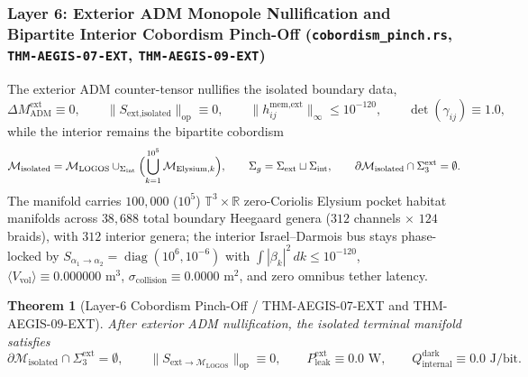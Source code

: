 \documentclass[11pt,onecolumn]{article}
\newtheorem{theorem}{Theorem}
\begin{document}
\subsubsection{Layer 6: Exterior ADM Monopole Nullification and Bipartite Interior Cobordism Pinch-Off (\texttt{cobordism\_pinch.rs}, \texttt{THM-AEGIS-07-EXT}, \texttt{THM-AEGIS-09-EXT})}
\label{subsec:aegis_layer6_cobordism}
The exterior ADM counter-tensor nullifies the isolated boundary data,
\begin{equation}
\Delta M_{\text{ADM}}^{\text{ext}}\equiv0,\qquad
\lVert S_{\text{ext},\text{isolated}}\rVert_{\text{op}}\equiv0,\qquad
\lVert h_{ij}^{\text{mem,ext}}\rVert_{\infty}\le10^{-120},\qquad
\det(\gamma_{ij})\equiv1.0,
\label{eq:aegis_adm_nullification}
\end{equation}
while the interior remains the bipartite cobordism
\begin{equation}
\mathcal{M}_{\text{isolated}}=\mathcal{M}_{\text{LOGOS}}\cup_{\Sigma_{\text{int}}}\Bigl(\bigcup_{k=1}^{10^5}\mathcal{M}_{\text{Elysium},k}\Bigr),
\qquad
\Sigma_g=\Sigma_{\text{ext}}\sqcup\Sigma_{\text{int}},
\qquad
\partial\mathcal{M}_{\text{isolated}}\cap\Sigma_3^{\text{ext}}=\emptyset .
\label{eq:aegis_bipartite}
\end{equation}
The manifold carries $100{,}000$ ($10^5$) $\mathbb{T}^3\times\mathbb{R}$ zero-Coriolis Elysium pocket habitat manifolds across $38{,}688$ total boundary Heegaard genera ($312$ channels $\times$ $124$ braids), with $312$ interior genera; the interior Israel--Darmois bus stays phase-locked by $S_{\alpha_1\to\alpha_2}=\operatorname{diag}(10^6,10^{-6})$ with $\int|\beta_k|^2\,dk\le10^{-120}$, $\langle V_{\text{vol}}\rangle\equiv0.000000\text{ m}^3$, $\sigma_{\text{collision}}\equiv0.0000\text{ m}^2$, and zero omnibus tether latency.

\begin{theorem}[Layer-6 Cobordism Pinch-Off / THM-AEGIS-07-EXT and THM-AEGIS-09-EXT]
After exterior ADM nullification, the isolated terminal manifold satisfies
\begin{equation}
\partial\mathcal M_{\text{isolated}}\cap\Sigma_3^{\text{ext}}=\emptyset,
\qquad
\|S_{\text{ext}\to\mathcal M_{\text{LOGOS}}}\|_{\text{op}}\equiv0,
\qquad
P_{\text{leak}}^{\text{ext}}\equiv0.0\text{ W},
\qquad
Q_{\text{internal}}^{\text{dark}}\equiv0.0\text{ J/bit}.
\label{eq:thm_aegis07_09_pinchoff}
\end{equation}
\end{theorem}
\end{document}
